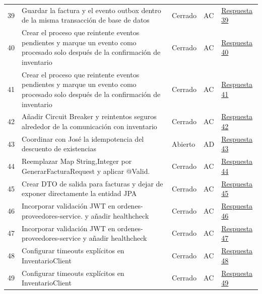 \documentclass[12pt,a4paper]{article}
\begin{document}
{\begin{longtable}{p{0.6cm}p{6.8cm}p{1.7cm}p{1.1cm}p{2.8cm}}
39 & Guardar la factura y el evento outbox dentro de la misma transacción de base de datos & Cerrado & AC & \href{https://github.com/JoseLozanoMorales/TiendaTech/issues/39#issuecomment-5499547112}{Respuesta 39} \\
40 & Crear el proceso que reintente eventos pendientes y marque un evento como procesado solo después de la confirmación de inventario & Cerrado & AC & \href{https://github.com/JoseLozanoMorales/TiendaTech/issues/40\#issuecomment-5548128749}{Respuesta 40} \\
41 & Crear el proceso que reintente eventos pendientes y marque un evento como procesado solo después de la confirmación de inventario & Cerrado & AC & \href{https://github.com/JoseLozanoMorales/TiendaTech/issues/41#issuecomment-5499549164}{Respuesta 41} \\
42 & Añadir Circuit Breaker y reintentos seguros alrededor de la comunicación con inventario & Cerrado & AC & \href{https://github.com/JoseLozanoMorales/TiendaTech/issues/42#issuecomment-5499562481}{Respuesta 42} \\
43 & Coordinar con José la idempotencia del descuento de existencias & Abierto & AD & \href{https://github.com/JoseLozanoMorales/TiendaTech/issues/43#issuecomment-5499955308}{Respuesta 43} \\
44 & Reemplazar Map String,Integer  por GenerarFacturaRequest y aplicar @Valid. & Cerrado & AC & \href{https://github.com/JoseLozanoMorales/TiendaTech/issues/44#issuecomment-5499551129}{Respuesta 44} \\
45 & Crear DTO de salida para facturas y dejar de exponer directamente la entidad JPA & Cerrado & AC & \href{https://github.com/JoseLozanoMorales/TiendaTech/issues/45#issuecomment-5499553220}{Respuesta 45} \\
46 & Incorporar validación JWT en ordenes-proveedores-service. y añadir healthcheck & Cerrado & AC & \href{https://github.com/JoseLozanoMorales/TiendaTech/issues/46\#issuecomment-5548128977}{Respuesta 46} \\
47 & Incorporar validación JWT en ordenes-proveedores-service y añadir healthcheck & Cerrado & AC & \href{https://github.com/JoseLozanoMorales/TiendaTech/issues/47#issuecomment-5499564428}{Respuesta 47} \\
48 & Configurar timeouts explícitos en InventarioClient & Cerrado & AC & \href{https://github.com/JoseLozanoMorales/TiendaTech/issues/48\#issuecomment-5548129164}{Respuesta 48} \\
49 & Configurar timeouts explícitos en InventarioClient & Cerrado & AC & \href{https://github.com/JoseLozanoMorales/TiendaTech/issues/49#issuecomment-5499565384}{Respuesta 49} \\

\end{longtable}}
\end{document}
